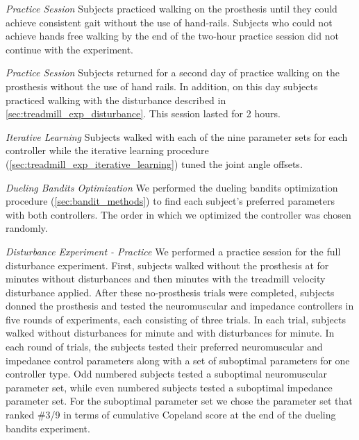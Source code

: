 \begin{days}
    \item\label{list:exp_day_1} \emph{Practice Session} Subjects practiced
    walking on the prosthesis until they could achieve consistent gait without
    the use of hand-rails. Subjects who could not achieve hands free walking by
    the end of the two-hour practice session did not continue with the
    experiment.

    \item\label{list:exp_day_2} \emph{Practice Session} Subjects returned for a
    second day of practice walking on the prosthesis without the use of hand
    rails. In addition, on this day subjects practiced walking with the
    disturbance described in \cref{sec:treadmill_exp_disturbance}. This session
    lasted for 2 hours.

    \item\label{list:exp_day_3} \emph{Iterative Learning} Subjects walked with
    each of the nine parameter sets for each controller while the iterative
    learning procedure (\cref{sec:treadmill_exp_iterative_learning}) tuned the
    joint angle offsets. 

    \item\label{list:exp_day_4} \emph{Dueling Bandits Optimization} We performed
    the dueling bandits optimization procedure (\cref{sec:bandit_methods}) to
    find each subject's preferred parameters with both controllers. The order in
    which we optimized the controller was chosen randomly.

    \item\label{list:exp_day_5} \emph{Disturbance Experiment - Practice} We
    performed a practice session for the full disturbance experiment. First,
    subjects walked without the prosthesis at  for
    \unit[2]{minutes} without disturbances and then \unit[2]{minutes} with the
    treadmill velocity disturbance applied. After these no-prosthesis trials
    were completed, subjects donned the prosthesis and tested the neuromuscular
    and impedance controllers in five rounds of experiments, each consisting of
    three trials. In each trial, subjects walked without disturbances for
    \unit[1]{minute} and with disturbances for \unit[1]{minute}. In each round
    of trials, the subjects tested their preferred neuromuscular and impedance
    control parameters along with a set of suboptimal parameters for one
    controller type. Odd numbered subjects tested a suboptimal neuromuscular
    parameter set, while even numbered subjects tested a suboptimal impedance
    parameter set. For the suboptimal parameter set we chose the parameter set
    that ranked \#3/9 in terms of cumulative Copeland score at the end of the
    dueling bandits experiment.


\end{days}
